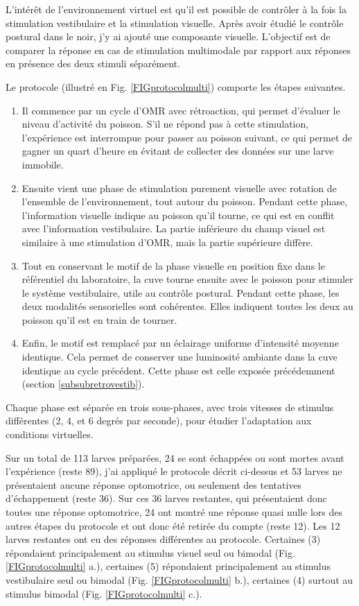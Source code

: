 L'intérêt de l'environnement virtuel est qu'il est possible de contrôler à la fois la stimulation vestibulaire et la stimulation visuelle. Après avoir étudié le contrôle postural dans le noir, j'y ai ajouté une composante visuelle. L'objectif est de comparer la réponse en cas de stimulation multimodale par rapport aux réponses en présence des deux stimuli séparément.

Le protocole (illustré en Fig. \ref{FIGprotocolmulti}) comporte les étapes suivantes. 

\begin{enumerate}
    \item Il commence par un cycle d'OMR avec rétroaction, qui permet d'évaluer le niveau d'activité du poisson. S'il ne répond pas à cette stimulation, l'expérience est interrompue pour passer au poisson suivant, ce qui permet de gagner un quart d'heure en évitant de collecter des données sur une larve immobile.
    \item Ensuite vient une phase de stimulation purement visuelle avec rotation de l'ensemble de l'environnement, tout autour du poisson. Pendant cette phase, l'information visuelle indique au poisson qu'il tourne, ce qui est en conflit avec l'information vestibulaire. La partie inférieure du champ visuel est similaire à une stimulation d'OMR, mais la partie supérieure diffère.
    \item Tout en conservant le motif de la phase visuelle en position fixe dans le référentiel du laboratoire, la cuve tourne ensuite avec le poisson pour stimuler le système vestibulaire, utile au contrôle postural. Pendant cette phase, les deux modalités sensorielles sont cohérentes. Elles indiquent toutes les deux au poisson qu'il est en train de tourner.
    \item Enfin, le motif est remplacé par un éclairage uniforme d'intensité moyenne identique. Cela permet de conserver une luminosité ambiante dans la cuve identique au cycle précédent. Cette phase est celle exposée précédemment (section \ref{subsubretrovestib}).
\end{enumerate}

Chaque phase est séparée en trois sous-phases, avec trois vitesses de stimulus différentes (2, 4, et 6 degrés par seconde), pour étudier l'adaptation aux conditions virtuelles.


Sur un total de 113 larves préparées, 24 se sont échappées ou sont mortes avant l'expérience (reste 89), j'ai appliqué le protocole décrit ci-dessus et 53 larves ne présentaient aucune réponse optomotrice, ou seulement des tentatives d'échappement (reste 36). Sur ces 36 larves restantes, qui présentaient donc toutes une réponse optomotrice, 24 ont montré une réponse quasi nulle lors des autres étapes du protocole et ont donc été retirée du compte (reste 12). Les 12 larves restantes ont eu des réponses différentes au protocole. Certaines (3) répondaient principalement au stimulus visuel seul ou bimodal (Fig. \ref{FIGprotocolmulti} a.), certaines (5) répondaient principalement au stimulus vestibulaire seul ou bimodal (Fig. \ref{FIGprotocolmulti} b.), certaines (4) surtout au stimulus bimodal (Fig. \ref{FIGprotocolmulti} c.).

